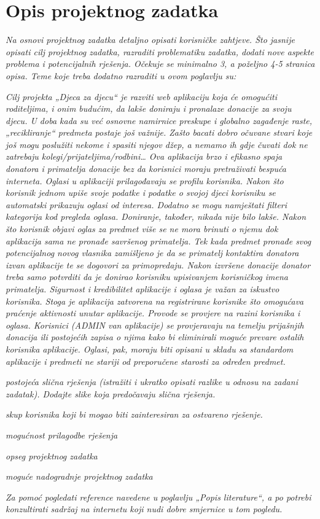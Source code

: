 \chapter{Opis projektnog zadatka}
		
		
		\textit{Na osnovi projektnog zadatka detaljno opisati korisničke zahtjeve. Što jasnije opisati cilj projektnog zadatka, razraditi problematiku zadatka, dodati nove aspekte problema i potencijalnih rješenja. Očekuje se minimalno 3, a poželjno 4-5 stranica opisa.	Teme koje treba dodatno razraditi u ovom poglavlju su:}
		\begin{packed_item}
			\item \textit{Cilj projekta „Djeca za djecu“ je razviti web aplikaciju koja će omogućiti roditeljima, i onim budućim, da lakše doniraju i pronalaze donacije za svoju djecu. 
U doba kada su već osnovne namirnice preskupe i globalno zagađenje raste, „recikliranje“ predmeta postaje još važnije. Zašto bacati dobro očuvane stvari koje još mogu poslužiti nekome i spasiti njegov džep, a nemamo ih gdje čuvati dok ne zatrebaju kolegi/prijateljima/rodbini…  
Ova aplikacija brzo i efikasno spaja donatora i primatelja donacije bez da korisnici moraju pretraživati bespuća interneta. Oglasi u aplikaciji prilagođavaju se profilu korisnika. Nakon što korisnik jednom upiše svoje podatke i podatke o svojoj djeci korisniku se automatski prikazuju oglasi od interesa. Dodatno se mogu namještati filteri kategorija kod pregleda oglasa. 
Doniranje, također, nikada nije bilo lakše. Nakon što korisnik objavi oglas za predmet više se ne mora brinuti o njemu dok aplikacija sama ne pronađe savršenog primatelja. Tek kada predmet pronađe svog potencijalnog novog vlasnika zamišljeno je da se primatelj kontaktira donatora izvan aplikacije te se dogovori za primopredaju. Nakon izvršene donacije donator treba samo potvrditi da je donirao korisniku upisivanjem korisničkog imena primatelja. 
Sigurnost i kredibilitet aplikacije i oglasa je važan za iskustvo korisnika. Stoga je aplikacija zatvorena na registrirane korisnike što omogućava praćenje aktivnosti unutar aplikacije. Provode se provjere na razini korisnika i oglasa. Korisnici (ADMIN van aplikacije) se provjeravaju na temelju prijašnjih donacija ili postojećih zapisa o njima kako bi eliminirali moguće prevare ostalih korisnika aplikacije. Oglasi, pak, moraju biti opisani u skladu sa standardom aplikacije i predmeti ne stariji od preporučene starosti za određen predmet. 
}
			\item \textit{postojeća slična rješenja (istražiti i ukratko opisati razlike u odnosu na zadani zadatak). Dodajte slike koja predočavaju slična rješenja.}
			\item \textit{skup korisnika koji bi mogao biti zainteresiran za ostvareno rješenje.}
			\item \textit{mogućnost prilagodbe rješenja }
			\item \textit{opseg projektnog zadatka}
			\item \textit{moguće nadogradnje projektnog zadatka}
		\end{packed_item}
		
		\textit{Za pomoć pogledati reference navedene u poglavlju „Popis literature“, a po potrebi konzultirati sadržaj na internetu koji nudi dobre smjernice u tom pogledu.}
		\eject
		